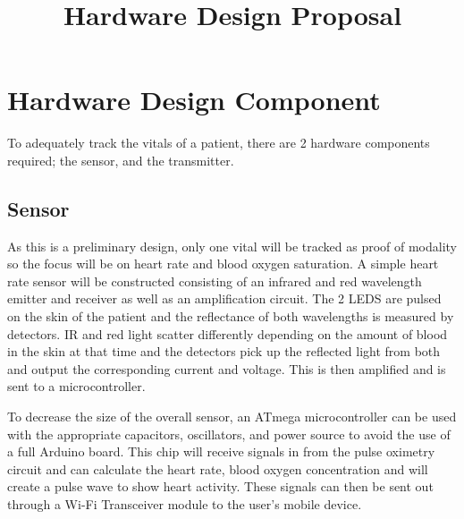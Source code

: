 \documentclass{article}
\title{Hardware Design Proposal}
\begin{document}
\newpage

\maketitle
\section{Hardware Design Component}

To adequately track the vitals of a patient, there are 2 hardware components required; the sensor, and the transmitter.
\subsection{Sensor}
As this is a preliminary design, only one vital will be tracked as proof of modality so the focus will be on heart rate and blood oxygen saturation. 
A simple heart rate sensor will be constructed consisting of an infrared and red wavelength emitter and receiver as well as an amplification circuit. 
The 2 LEDS are pulsed on the skin of the patient and the reflectance of both wavelengths is measured by detectors. IR and red light scatter differently 
depending on the amount of blood in the skin at that time and the detectors pick up the reflected light from both and output the corresponding current and 
voltage. This is then amplified and is sent to a microcontroller. \par

To decrease the size of the overall sensor, an ATmega microcontroller can be used with the appropriate capacitors, oscillators, and power source to avoid the 
use of a full Arduino board. This chip will receive signals in from the pulse oximetry circuit and can calculate the heart rate, blood oxygen concentration and
 will create a pulse wave to show heart activity. These signals can then be sent out through a Wi-Fi Transceiver module to the user’s mobile device. 
\end{document}
